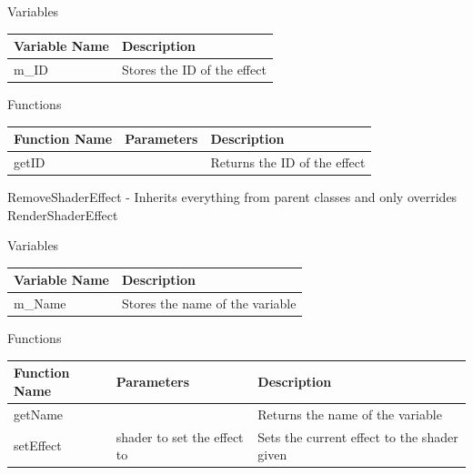 \documentclass{article}
\begin{document}
                \begin{center}
                    Variables
                    \begin{tabular}{ | m{} | m{} | }
                        \hline
                        \textbf{Variable Name} & \textbf{Description} \\
                        \hline
                        m\_ID & Stores the ID of the effect \\
                        \hline
                    \end{tabular}
                    Functions
                    \begin{tabular}{ | m{} | m{}| m{} | }
                        \hline
                        \textbf{Function Name} & \textbf{Parameters} & \textbf{Description} \\
                        \hline
                        getID & & Returns the ID of the effect \\
                        \hline
                    \end{tabular}
                \end{center}
                RemoveShaderEffect - Inherits everything from parent classes and only overrides \\
                RenderShaderEffect
                \begin{center}
                    Variables
                    \begin{tabular}{ | m{} | m{} | }
                        \hline
                        \textbf{Variable Name} & \textbf{Description} \\
                        \hline
                        m\_Name & Stores the name of the variable \\
                        \hline
                    \end{tabular}
                    Functions
                    \begin{tabular}{ | m{} | m{}| m{} | }
                        \hline
                        \textbf{Function Name} & \textbf{Parameters} & \textbf{Description} \\
                        \hline
                        getName & & Returns the name of the variable \\
                        \hline
                        setEffect & shader to set the effect to & Sets the current effect to the shader given \\
                        \hline
                    \end{tabular}
                \end{center}
\end{document}
